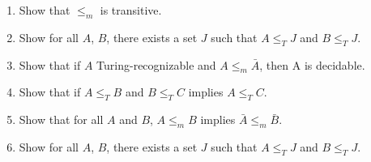 \documentclass[11pt]{article}
\begin{document}
\begin{enumerate}
\begin{enumerate}
	\item Show that $\leq_m$ is transitive.
	\item Show for all $A$, $B$, there exists a set  $J$ such that 
		$A\leq_T J$ and $B\leq_T J$.	
		
	\item Show that if $A$ Turing-recognizable and $A \leq_m \bar{A}$, then A is decidable.
	\item Show that if $A\leq_T B$ and $B\leq_T C$ implies $A\leq_T C$.
	
	\item Show that for all $A$ and $B$,  $A \leq_m B$ implies $\bar{A} \leq_m \bar{B}$.
	\item Show for all $A$, $B$, there exists a set  $J$ such that 
		$A\leq_T J$ and $B\leq_T J$.	

\end{enumerate}

\end{enumerate}
\end{document}
